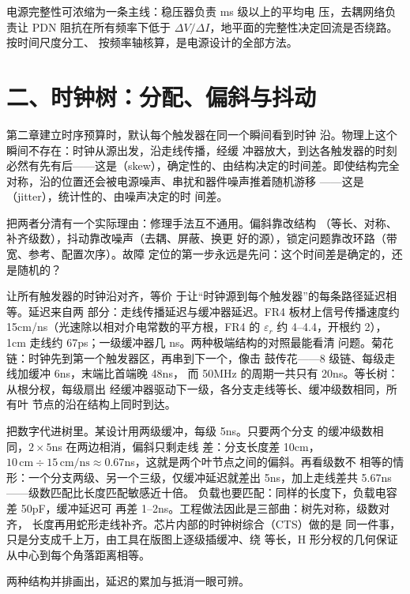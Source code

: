 \begin{keyidea}
电源完整性可浓缩为一条主线：稳压器负责 ms 级以上的平均电
压，去耦网络负责让 PDN 阻抗在所有频率下低于 $\Delta V /
\Delta I$，地平面的完整性决定回流是否绕路。按时间尺度分工、
按频率轴核算，是电源设计的全部方法。
\end{keyidea}

\section{二、时钟树：分配、偏斜与抖动}

第二章建立时序预算时，默认每个触发器在同一个瞬间看到时钟
沿。物理上这个瞬间不存在：时钟从源出发，沿走线传播，经缓
冲器放大，到达各触发器的时刻必然有先有后——这是（skew），确定性的、由结构决定的时间差。即使结构完全
对称，沿的位置还会被电源噪声、串扰和器件噪声推着随机游移
——这是（jitter），统计性的、由噪声决定的时
间差。

把两者分清有一个实际理由：修理手法互不通用。偏斜靠改结构
（等长、对称、补齐级数），抖动靠改噪声（去耦、屏蔽、换更
好的源），锁定问题靠改环路（带宽、参考、配置次序）。故障
定位的第一步永远是先问：这个时间差是确定的，还是随机的？

让所有触发器的时钟沿对齐，等价
于让“时钟源到每个触发器”的每条路径延迟相等。延迟来自两
部分：走线传播延迟与缓冲器延迟。FR4 板材上信号传播速度约
15cm/ns（光速除以相对介电常数的平方根，FR4 的 $\varepsilon_r$ 约 4--4.4，开根约 2），1cm
走线约 67ps；一级缓冲器几 ns。两种极端结构的对照最能看清
问题。菊花链：时钟先到第一个触发器区，再串到下一个，像击
鼓传花——8 级链、每级走线加缓冲 6ns，末端比首端晚 48ns，
而 50MHz 的周期一共只有 20ns。等长树：从根分杈，每级扇出
经缓冲器驱动下一级，各分支走线等长、缓冲级数相同，所有叶
节点的沿在结构上同时到达。

把数字代进树里。某设计用两级缓冲，每级 5ns。只要两个分支
的缓冲级数相同，$2 \times 5$ns 在两边相消，偏斜只剩走线
差：分支长度差 10cm，$10\,\mathrm{cm} \div 15\,\mathrm{cm/ns}
\approx 0.67$ns，这就是两个叶节点之间的偏斜。再看级数不
相等的情形：一个分支两级、另一个三级，仅缓冲延迟就差出
5ns，加上走线差共 5.67ns——级数匹配比长度匹配敏感近十倍。
负载也要匹配：同样的长度下，负载电容差 50pF，缓冲延迟可
再差 1--2ns。工程做法因此是三部曲：树先对称，级数对齐，
长度再用蛇形走线补齐。芯片内部的时钟树综合（CTS）做的是
同一件事，只是分支成千上万，由工具在版图上逐级插缓冲、绕
等长，H 形分杈的几何保证从中心到每个角落距离相等。

两种结构并排画出，延迟的累加与抵消一眼可辨。

